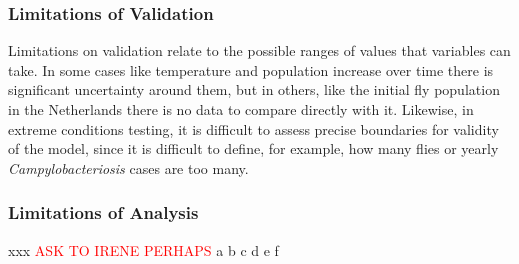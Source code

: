 \subsubsection{Limitations of Validation}

Limitations on validation relate to the possible ranges of values that variables can take. In some cases like temperature and population increase over time there is significant uncertainty around them, but in others, like the initial fly population in the Netherlands there is no data to compare directly with it. Likewise, in extreme conditions testing, it is difficult to assess precise boundaries for validity of the model, since it is difficult to define, for example, how many flies or yearly \textit{Campylobacteriosis} cases are too many.

\subsubsection{Limitations of Analysis}
xxx
\textcolor{red}{ASK TO IRENE PERHAPS}
a b c d e f

